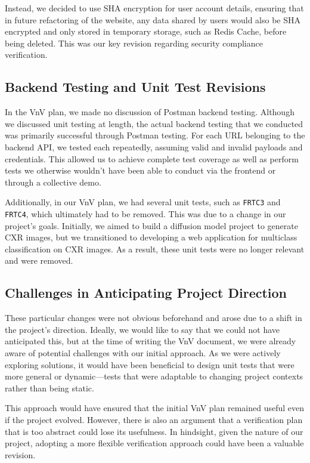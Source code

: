 \documentclass[12pt, titlepage]{article}
\begin{document}
\begin{enumerate}
  Instead, we decided to use SHA encryption for user account details, ensuring that in future refactoring of the website, any data shared by users would also be SHA encrypted and only stored in temporary storage, such as Redis Cache, before being deleted. This was our key revision regarding security compliance verification.
  
  \subsection{Backend Testing and Unit Test Revisions}
  
  In the VnV plan, we made no discussion of Postman backend testing. Although we discussed unit testing at length, the actual backend testing that we conducted was primarily successful through Postman testing. For each URL belonging to the backend API, we tested each repeatedly, assuming valid and invalid payloads and credentials. This allowed us to achieve complete test coverage as well as perform tests we otherwise wouldn’t have been able to conduct via the frontend or through a collective demo.
  
  Additionally, in our VnV plan, we had several unit tests, such as \texttt{FRTC3} and \texttt{FRTC4}, which ultimately had to be removed. This was due to a change in our project’s goals. Initially, we aimed to build a diffusion model project to generate CXR images, but we transitioned to developing a web application for multiclass classification on CXR images. As a result, these unit tests were no longer relevant and were removed.
  
  \subsection{Challenges in Anticipating Project Direction}
  
  These particular changes were not obvious beforehand and arose due to a shift in the project’s direction. Ideally, we would like to say that we could not have anticipated this, but at the time of writing the VnV document, we were already aware of potential challenges with our initial approach. As we were actively exploring solutions, it would have been beneficial to design unit tests that were more general or dynamic—tests that were adaptable to changing project contexts rather than being static. 
  
  This approach would have ensured that the initial VnV plan remained useful even if the project evolved. However, there is also an argument that a verification plan that is too abstract could lose its usefulness. In hindsight, given the nature of our project, adopting a more flexible verification approach could have been a valuable revision.
  

\end{enumerate}
\end{document}
